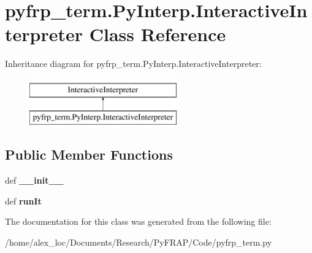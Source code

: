 \hypertarget{classpyfrp__term_1_1PyInterp_1_1InteractiveInterpreter}{\section{pyfrp\+\_\+term.\+Py\+Interp.\+Interactive\+Interpreter Class Reference}
\label{classpyfrp__term_1_1PyInterp_1_1InteractiveInterpreter}
}
Inheritance diagram for pyfrp\+\_\+term.\+Py\+Interp.\+Interactive\+Interpreter\+:\begin{figure}[H]
\begin{center}
\leavevmode
\includegraphics[height=2.000000cm]{classpyfrp__term_1_1PyInterp_1_1InteractiveInterpreter}
\end{center}
\end{figure}
\subsection*{Public Member Functions}
\begin{DoxyCompactItemize}
\item 
\hypertarget{classpyfrp__term_1_1PyInterp_1_1InteractiveInterpreter_a5f8b5d51f33e379f60151591a3761d54}{def {\bfseries \+\_\+\+\_\+init\+\_\+\+\_\+}}\label{classpyfrp__term_1_1PyInterp_1_1InteractiveInterpreter_a5f8b5d51f33e379f60151591a3761d54}

\item 
\hypertarget{classpyfrp__term_1_1PyInterp_1_1InteractiveInterpreter_a4eea442886b0170d3baf23ae9634b425}{def {\bfseries run\+It}}\label{classpyfrp__term_1_1PyInterp_1_1InteractiveInterpreter_a4eea442886b0170d3baf23ae9634b425}

\end{DoxyCompactItemize}


The documentation for this class was generated from the following file\+:\begin{DoxyCompactItemize}
\item 
/home/alex\+\_\+loc/\+Documents/\+Research/\+Py\+F\+R\+A\+P/\+Code/pyfrp\+\_\+term.\+py\end{DoxyCompactItemize}
